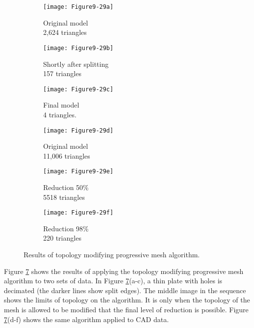 \begin{description}
\begin{figure}[htb]
    \centering
	\begin{subfigure}[h]{0.32\linewidth}
		\texttt{[image: Figure9-29a]}
		\captionsetup{justification=centering}
		\caption{Original model \\ 2,624 triangles}
		\label{fig:Figure9-29a}
	\end{subfigure}
	\hfill
	\begin{subfigure}[h]{0.32\linewidth}
		\texttt{[image: Figure9-29b]}
		\captionsetup{justification=centering}
		\caption{Shortly after splitting \\ 157 triangles}
		\label{fig:Figure9-29b}
	\end{subfigure}
	\hfill
	\begin{subfigure}[h]{0.32\linewidth}
		\texttt{[image: Figure9-29c]}
		\captionsetup{justification=centering}
        \caption{Final model \\ 4 triangles.}
		\label{fig:Figure9-29c}
	\end{subfigure}
	\hfill
	\begin{subfigure}[h]{0.32\linewidth}
		\texttt{[image: Figure9-29d]}
		\captionsetup{justification=centering}
		\caption{Original model \\ 11,006 triangles}
		\label{fig:Figure9-29d}
	\end{subfigure}
	\hfill
	\begin{subfigure}[h]{0.32\linewidth}
		\texttt{[image: Figure9-29e]}
		\captionsetup{justification=centering}
		\caption{Reduction 50\% \\ 5518 triangles}
		\label{fig:Figure9-29e}
	\end{subfigure}
	\hfill
	\begin{subfigure}[h]{0.32\linewidth}
		\texttt{[image: Figure9-29f]}
		\captionsetup{justification=centering}
        \caption{Reduction 98\% \\ 220 triangles}
		\label{fig:Figure9-29f}
	\end{subfigure}
	\caption{ Results of topology modifying progressive mesh algorithm.}\label{fig:Figure9-29}
\end{figure}

Figure \ref{fig:Figure9-29} shows the results of applying the topology modifying progressive mesh algorithm to two sets of data. In Figure \ref{fig:Figure9-29}(a-c), a thin plate with holes is decimated (the darker lines show split edges). The middle image in the sequence shows the limits of topology on the algorithm. It is only when the topology of the mesh is allowed to be modified that the final level of reduction is possible. Figure \ref{fig:Figure9-29}(d-f) shows the same algorithm applied to CAD data.

\end{description}

